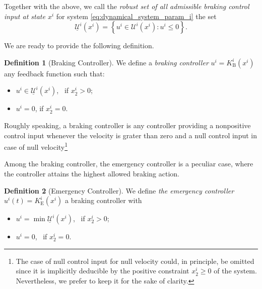 \documentclass[letterpaper, 10 pt, conference]{ieeeconf}
\newcounter{Definition}
\theoremstyle{definition}
\theoremstyle{nopoint}
\newtheorem{definitionNoPoint}{Definition}
\begin{document}
Together with the above, we call the {\em robust set of all admissible braking control input at state $x^i$} for system \eqref{eq:dynamical_system_param_i} the set
\begin{equation}\label{eq:admissible_braking_inputs}
\underline{\mathcal{U}}^i(x^i)=\left\{u^i\in\mathcal{U}^i(x^i): u^i\leq 0 \right\}.
\end{equation}

We are ready to provide the following definition.
\begin{definitionNoPoint}[Braking  Controller]
We define a {\em braking  controller} $u^i= K^i_\mathrm{B}(x^i)$ any feedback function such that:
\begin{itemize}
\item $u^i \in \underline{\mathcal{U}}^i(x^i)$, \, \quad if $x_2^i >0$;
\item $u^i=0$, \qquad \quad \; if $x_2^i =0$.
\end{itemize} 
\end{definitionNoPoint}


Roughly speaking, a braking controller is any controller providing a nonpositive control input whenever the velocity is grater than zero and a null control input in case of null velocity\footnote{The case of null control input for null velocity could, in principle, be omitted since it is implicitly deducible by the positive constraint $x_2^i\geq 0$ of the system. Nevertheless, we prefer to keep it for the sake of clarity.}

Among the braking  controller, the emergency controller is a peculiar case, where the controller attains the highest allowed braking  action.

\begin{definitionNoPoint}[Emergency Controller]\label{def:emergency_controller}
We define  {\em the emergency controller} $u^i(t)= K^i_\mathrm{E}(x^i)$ a braking  controller with
\begin{itemize}
\item $u^i = \min \underline{\mathcal{U}}^i(x^i)$, \, \quad if $x_2^i >0$;
\item $u^i=0$, \qquad \qquad \quad \, if $x_2^i =0$.
\end{itemize} 
\end{definitionNoPoint}
\end{document}
